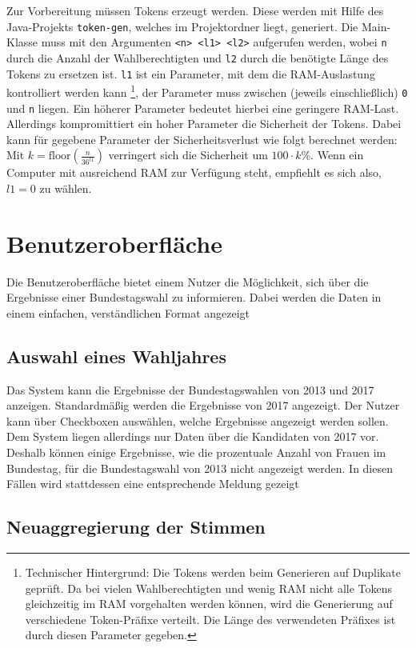\documentclass[a4paper]{scrreprt}
\begin{document}
Zur Vorbereitung müssen Tokens erzeugt werden.
Diese werden mit Hilfe des Java-Projekts \texttt{token-gen}, welches im Projektordner liegt, generiert.
Die Main-Klasse muss mit den Argumenten \texttt{<n> <l1> <l2>} aufgerufen werden, wobei \texttt{n} durch die Anzahl der Wahlberechtigten und \texttt{l2} durch die benötigte Länge des Tokens zu ersetzen ist.
\texttt{l1} ist ein Parameter, mit dem die RAM-Auslastung kontrolliert werden kann
\footnote{
	Technischer Hintergrund:
	Die Tokens werden beim Generieren auf Duplikate geprüft.
	Da bei vielen Wahlberechtigten und wenig RAM nicht alle Tokens gleichzeitig im RAM vorgehalten werden können, wird die Generierung auf verschiedene Token-Präfixe verteilt.
	Die Länge des verwendeten Präfixes ist durch diesen Parameter gegeben.
},
der Parameter muss zwischen (jeweils einschließlich) \texttt{0} und \texttt{n} liegen.
Ein höherer Parameter bedeutet hierbei eine geringere RAM-Last.
Allerdings kompromittiert ein hoher Parameter die Sicherheit der Tokens.
Dabei kann für gegebene Parameter der Sicherheitsverlust wie folgt berechnet werden:
Mit $k = \mathrm{floor}(\frac{n}{36^{l1}})$ verringert sich die Sicherheit um $100\cdot k$\%.
Wenn ein Computer mit ausreichend RAM zur Verfügung steht, empfiehlt es sich also, $l1 = 0$ zu wählen.

\section{Benutzeroberfläche}

Die Benutzeroberfläche bietet einem Nutzer die Möglichkeit, sich über die Ergebnisse einer Bundestagswahl zu informieren. Dabei werden die Daten in einem einfachen, verständlichen Format angezeigt

\subsection{Auswahl eines Wahljahres}

Das System kann die Ergebnisse der Bundestagswahlen von 2013 und 2017 anzeigen. Standardmäßig werden die Ergebnisse von 2017 angezeigt. Der Nutzer kann über Checkboxen auswählen, welche Ergebnisse angezeigt werden sollen. Dem System liegen allerdings nur Daten über die Kandidaten von 2017 vor. Deshalb können einige Ergebnisse, wie die prozentuale Anzahl von Frauen im Bundestag, für die Bundestagswahl von 2013 nicht angezeigt werden. In diesen Fällen wird stattdessen eine entsprechende Meldung gezeigt


\subsection{Neuaggregierung der Stimmen}
\end{document}
